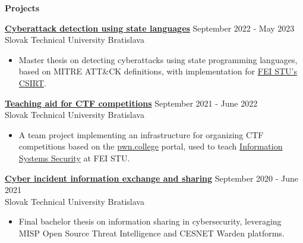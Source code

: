 \documentclass[12pt]{article}
\begin{document}

\vspace{0.2in} %

\begin{center}
	{\noindent \bfseries Projects}
\end{center}

\vspace{0.1pt}

\noindent
{\bfseries \href{https://opac.crzp.sk/?fn=detailBiblioFormChildU1JSMF&sid=C0DEB8E07572332BAD240C15805F&seo=CRZP-detail-kniha}{Cyberattack detection using state languages} } \hfill September 2022 - May 2023 \\
\noindent Slovak Technical University \hfill Bratislava 
\begin{itemize} \itemsep -2pt %
	\item Master thesis on detecting cyberattacks using state programming languages, based on MITRE ATT\&CK definitions, with implementation for \href{https://csirt.fei.stuba.sk}{FEI STU's CSIRT}.
\end{itemize}

\noindent
{\bfseries \href{https://github.com/feictf/tp_feictf}{Teaching aid for CTF competitions} } \hfill September 2021 - June 2022 \\
\noindent Slovak Technical University \hfill Bratislava 
\begin{itemize} \itemsep -2pt %
	\item A team project implementing an infrastructure for organizing CTF competitions based on the \href{https://pwn.college/}{pwn.college} portal, used to teach \href{https://uim.fei.stuba.sk/predmet/i-bispp/}{Information Systems Security} at FEI STU.
\end{itemize}

\noindent
{\bfseries \href{https://opac.crzp.sk/?fn=DETAILBIBLIOFORMChildCB96V&sid=38F43C5054BC4F7F2DBBCFF31F28&seo=CRZP-detail-kniha}{Cyber incident information exchange and sharing} } \hfill September 2020 - June 2021 \\
\noindent Slovak Technical University \hfill Bratislava 
\begin{itemize} \itemsep -2pt %
	\item Final bachelor thesis on information sharing in cybersecurity, leveraging MISP Open Source Threat Intelligence and CESNET Warden platforms.
\end{itemize}
\end{document}
